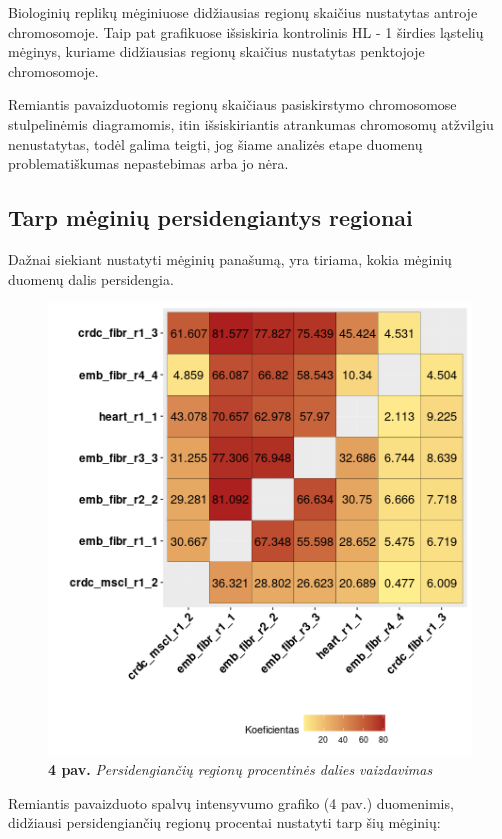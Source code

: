 \documentclass[12pt]{article}
\begin{document}
Biologinių replikų mėginiuose didžiausias regionų skaičius nustatytas antroje
chromosomoje. Taip pat grafikuose išsiskiria kontrolinis HL - 1 širdies
ląstelių mėginys, kuriame didžiausias regionų skaičius nustatytas penktojoje
chromosomoje.

Remiantis pavaizduotomis regionų skaičiaus pasiskirstymo chromosomose
stulpelinėmis diagramomis, itin išsiskiriantis atrankumas chromosomų atžvilgiu
nenustatytas, todėl galima teigti, jog šiame analizės etape duomenų
problematiškumas nepastebimas arba jo nėra.

\newpage


\subsection{Tarp mėginių persidengiantys regionai}
Dažnai siekiant nustatyti mėginių panašumą, yra tiriama, kokia mėginių duomenų
dalis persidengia.

\begin{figure}[htb]
    \begin{center}
        \includegraphics[width=0.7\linewidth]{../Figures/peak_overlaps.png}
        \caption*{\textbf{4 pav.} \emph{Persidengiančių regionų procentinės
                  dalies vaizdavimas}}
    \end{center}
\end{figure}

Remiantis pavaizduoto spalvų intensyvumo grafiko (4 pav.) duomenimis, didžiausi
persidengiančių regionų procentai nustatyti tarp šių mėginių:
\end{document}
